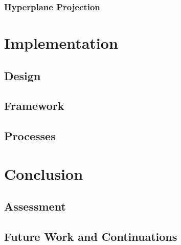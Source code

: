 \documentclass[a4paper, notitlepage]{report}
\begin{document}
\section{Hyperplane Projection}
\label{sec:org2528aa4}

\part{Implementation}
\label{sec:orgf9f2f1e}

\chapter{Design}
\label{sec:orga7d36e1}

\chapter{Framework}
\label{sec:org0274879}

\chapter{Processes}
\label{sec:org56faaed}

\part{Conclusion}
\label{sec:org70d817a}

\chapter{Assessment}
\label{sec:orgc5a67ae}

\chapter{Future Work and Continuations}
\label{sec:org1282ad3}


\appendix
\end{document}

